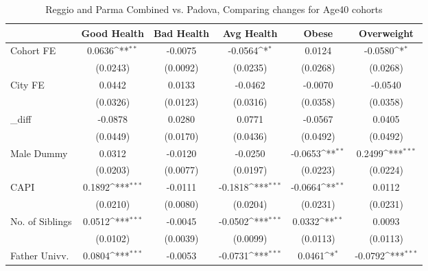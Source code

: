 \begin{table}[htbp]\centering
\def\sym#1{\ifmmode^{#1}\else\(^{#1}\)\fi}
\caption{Reggio and Parma Combined vs. Padova, Comparing changes for Age40 cohorts}
\begin{tabular}{l*{5}{c}}
\toprule
            &\multicolumn{1}{c}{Good Health}&\multicolumn{1}{c}{Bad Health}&\multicolumn{1}{c}{Avg Health}&\multicolumn{1}{c}{Obese}&\multicolumn{1}{c}{Overweight}\\
\midrule
Cohort FE   &      0.0636\sym{**} &     -0.0075         &     -0.0564\sym{*}  &      0.0124         &     -0.0580\sym{*}  \\
            &    (0.0243)         &    (0.0092)         &    (0.0235)         &    (0.0268)         &    (0.0268)         \\
\addlinespace
City FE     &      0.0442         &      0.0133         &     -0.0462         &     -0.0070         &     -0.0540         \\
            &    (0.0326)         &    (0.0123)         &    (0.0316)         &    (0.0358)         &    (0.0358)         \\
\addlinespace
\_diff       &     -0.0878         &      0.0280         &      0.0771         &     -0.0567         &      0.0405         \\
            &    (0.0449)         &    (0.0170)         &    (0.0436)         &    (0.0492)         &    (0.0492)         \\
\addlinespace
Male Dummy  &      0.0312         &     -0.0120         &     -0.0250         &     -0.0653\sym{**} &      0.2499\sym{***}\\
            &    (0.0203)         &    (0.0077)         &    (0.0197)         &    (0.0223)         &    (0.0224)         \\
\addlinespace
CAPI        &      0.1892\sym{***}&     -0.0111         &     -0.1818\sym{***}&     -0.0664\sym{**} &      0.0112         \\
            &    (0.0210)         &    (0.0080)         &    (0.0204)         &    (0.0231)         &    (0.0231)         \\
\addlinespace
No. of Siblings&      0.0512\sym{***}&     -0.0045         &     -0.0502\sym{***}&      0.0332\sym{**} &      0.0093         \\
            &    (0.0102)         &    (0.0039)         &    (0.0099)         &    (0.0113)         &    (0.0113)         \\
\addlinespace
Father Univv.&      0.0804\sym{***}&     -0.0053         &     -0.0731\sym{***}&      0.0461\sym{*}  &     -0.0792\sym{***}\\

\end{tabular}
\end{table}
